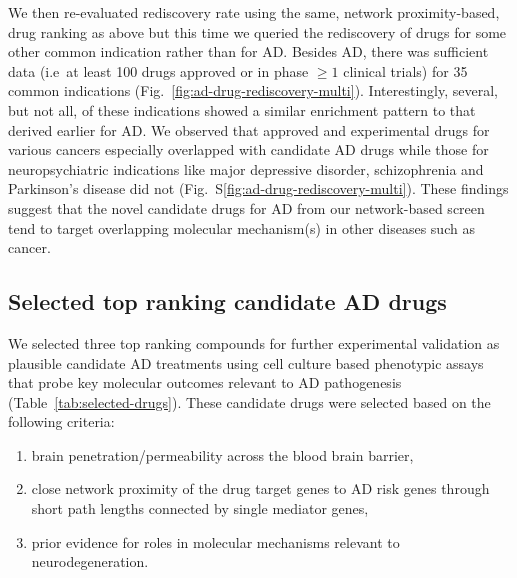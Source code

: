 \documentclass[letterpaper]{article}
\begin{document}
We then re-evaluated rediscovery rate using the same, network proximity-based,
drug ranking as above but this time we queried the rediscovery of drugs for
some other common indication rather than for AD.  Besides AD, there was
sufficient data (i.e~at least 100 drugs approved or in phase $\ge 1$ clinical
trials) for 35 common indications (Fig.~\ref{fig:ad-drug-rediscovery-multi}).
Interestingly, several, but not all, of these indications showed a similar
enrichment pattern to that derived earlier for AD.  We observed that approved
and experimental drugs for various cancers especially overlapped with
candidate AD drugs while those for neuropsychiatric indications like major
depressive disorder, schizophrenia and Parkinson's disease did not
(Fig.~S\ref{fig:ad-drug-rediscovery-multi}).  These findings suggest that the
novel candidate drugs for AD from our network-based screen tend to target
overlapping molecular mechanism(s) in other diseases such as cancer. 


\subsection{Selected top ranking candidate AD drugs}

We selected three top ranking compounds for further experimental validation as
plausible candidate AD treatments using cell culture based phenotypic assays
that probe key molecular outcomes relevant to AD pathogenesis
(Table~\ref{tab:selected-drugs}). These candidate drugs were selected based on the following criteria:
\begin{enumerate}
  \item brain penetration/permeability across the blood brain barrier,
  \item close network proximity of the drug target genes to AD risk genes through short path lengths connected by single mediator genes,
  \item prior evidence for roles in molecular mechanisms relevant to neurodegeneration.
\end{enumerate}
\end{document}
